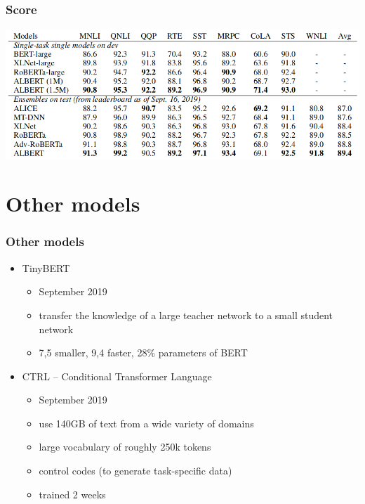 \documentclass{beamer}
\begin{document}
\begin{frame}
    \frametitle{Score}
    \begin{center}
        \includegraphics[scale=1.5]{img/albert-score.png}
    \end{center}
\end{frame}



\section{Other models}
\begin{frame}
    \frametitle{Other models}
    \begin{itemize}
        \item TinyBERT \cite{tidybert}
        \begin{itemize}
            \item September 2019
            \item transfer the knowledge of a large teacher network to a small student network
            \item 7,5 smaller, 9,4 faster, 28\% parameters of BERT
        \end{itemize}
        \item CTRL -- Conditional Transformer Language \cite{ctrl}
        \begin{itemize}
            \item September 2019
            \item use 140GB of text from a wide variety of domains
            \item large vocabulary of roughly 250k tokens
            \item control codes (to generate task-specific data)
            \item trained 2 weeks
        \end{itemize}
    \end{itemize}
\end{frame}
\end{document}
